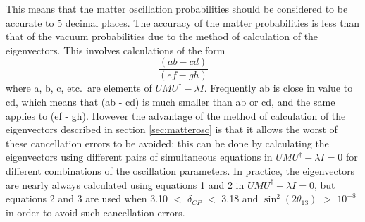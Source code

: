 This means that the matter oscillation probabilities should be considered to be accurate to 5 decimal places. The accuracy of the matter probabilities 
is less than that of the vacuum probabilities due to the method of calculation of the eigenvectors. This involves calculations of the form 
\begin{displaymath}
\frac{(ab - cd)}{(ef - gh)}
\end{displaymath} 
where a, b, c, etc.\ are elements of $U M U^{\dagger} - \lambda I$. Frequently ab is close in value to cd, which means that (ab - cd) is much smaller than ab or 
cd, and the same applies to (ef - gh). However the advantage of the method of calculation of the eigenvectors described in section \ref{sec:matterosc} 
is that it allows  the worst of these cancellation errors to be avoided; this can be done by calculating the eigenvectors using different pairs of 
simultaneous equations in  $U M U^{\dagger} - \lambda I = 0$ for different combinations of the oscillation parameters. 
In practice, the eigenvectors are nearly always calculated using equations 1 and 2 in $U M U^{\dagger} - \lambda I = 0$, 
but equations 2 and 3 are used when 3.10 $<$ $\delta_{CP}$ $<$ 3.18 and 
$\sin^{2}(2 \theta_{13})$ $>$ $10^{-8}$ in order to avoid such cancellation errors.  







